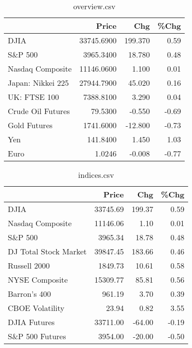 \documentclass{article}%
\begin{document}
\begin{table}[htbp]%
\caption{overview.csv}%
\centering%
\begin{adjustbox}{width=1\textwidth}%
\begin{tabular}{lrrr}
\toprule
                  &      Price &     Chg &  \%Chg \\
\midrule
             DJIA & 33745.6900 & 199.370 &  0.59 \\
          S\&P 500 &  3965.3400 &  18.780 &  0.48 \\
 Nasdaq Composite & 11146.0600 &   1.100 &  0.01 \\
Japan: Nikkei 225 & 27944.7900 &  45.020 &  0.16 \\
     UK: FTSE 100 &  7388.8100 &   3.290 &  0.04 \\
Crude Oil Futures &    79.5300 &  -0.550 & -0.69 \\
     Gold Futures &  1741.6000 & -12.800 & -0.73 \\
              Yen &   141.8400 &   1.450 &  1.03 \\
             Euro &     1.0246 &  -0.008 & -0.77 \\
\bottomrule
\end{tabular}
%
\end{adjustbox}%
\end{table}

%


\begin{table}[htbp]%
\caption{indices.csv}%
\centering%
\begin{adjustbox}{width=1\textwidth}%
\begin{tabular}{lrrr}
\toprule
                      &    Price &    Chg &  \%Chg \\
\midrule
                 DJIA & 33745.69 & 199.37 &  0.59 \\
     Nasdaq Composite & 11146.06 &   1.10 &  0.01 \\
              S\&P 500 &  3965.34 &  18.78 &  0.48 \\
DJ Total Stock Market & 39847.45 & 183.66 &  0.46 \\
         Russell 2000 &  1849.73 &  10.61 &  0.58 \\
       NYSE Composite & 15309.77 &  85.81 &  0.56 \\
         Barron's 400 &   961.19 &   3.70 &  0.39 \\
      CBOE Volatility &    23.94 &   0.82 &  3.55 \\
         DJIA Futures & 33711.00 & -64.00 & -0.19 \\
      S\&P 500 Futures &  3954.00 & -20.00 & -0.50 \\
\bottomrule
\end{tabular}
%
\end{adjustbox}%
\end{table}
\end{document}
